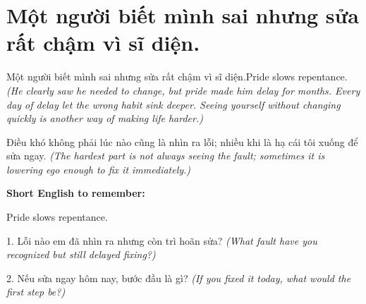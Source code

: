 \section{Một người biết mình sai nhưng sửa rất chậm vì sĩ diện.}
\begin{truyen}{Một người biết mình sai nhưng sửa rất chậm vì sĩ diện.}{Pride slows repentance.}
\textit{(He clearly saw he needed to change, but pride made him delay for months. Every day of delay let the wrong habit sink deeper. Seeing yourself without changing quickly is another way of making life harder.)}
\end{truyen}
\begin{baihoc}
Điều khó không phải lúc nào cũng là nhìn ra lỗi; nhiều khi là hạ cái tôi xuống để sửa ngay.
\textit{(The hardest part is not always seeing the fault; sometimes it is lowering ego enough to fix it immediately.)}
\end{baihoc}
\begin{ghinhoanh}\textbf{Short English to remember:}

Pride slows repentance.
\end{ghinhoanh}
\begin{tuhocnhanh}
1. Lỗi nào em đã nhìn ra nhưng còn trì hoãn sửa? \textit{(What fault have you recognized but still delayed fixing?)}

2. Nếu sửa ngay hôm nay, bước đầu là gì? \textit{(If you fixed it today, what would the first step be?)}
\end{tuhocnhanh}
\ngancach

